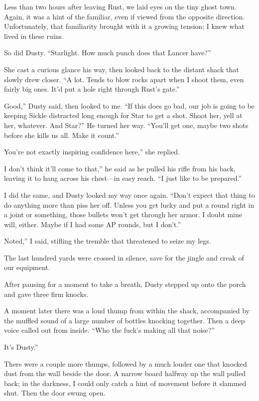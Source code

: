 Less than two hours after leaving Rust, we laid eyes on the tiny ghost town. Again, it was a hint of the familiar, even if viewed from the opposite direction. Unfortunately, that familiarity brought with it a growing tension; I knew what lived in these ruins.

So did Dusty. “Starlight. How much punch does that Lancer have?”

She cast a curious glance his way, then looked back to the distant shack that slowly drew closer. “A lot. Tends to blow rocks apart when I shoot them, even fairly big ones. It’d put a hole right through Rust’s gate.”

\leavevmode{}Good,” Dusty said, then looked to me. “If this does go bad, our job is going to be keeping Sickle distracted long enough for Star to get a shot. Shoot her, yell at her, whatever. And Star?” He turned her way. “You’ll get one, maybe two shots before she kills us all. Make it count.”

\leavevmode{}You’re not exactly inspiring confidence here,” she replied.

\leavevmode{}I don’t think it’ll come to that,” he said as he pulled his rifle from his back, leaving it to hang across his chest—in easy reach. “I just like to be prepared.”

I did the same, and Dusty looked my way once again. “Don’t expect that thing to do anything more than piss her off. Unless you get lucky and put a round right in a joint or something, those bullets won’t get through her armor. I doubt mine will, either. Maybe if I had some AP rounds, but I don’t.”

\leavevmode{}Noted,” I said, stifling the tremble that threatened to seize my legs.

The last hundred yards were crossed in silence, save for the jingle and creak of our equipment.

After pausing for a moment to take a breath, Dusty stepped up onto the porch and gave three firm knocks.

A moment later there was a loud thump from within the shack, accompanied by the muffled sound of a large number of bottles knocking together. Then a deep voice called out from inside. “Who the fuck’s making all that noise?”

\leavevmode{}It’s Dusty.”

There were a couple more thumps, followed by a much louder one that knocked dust from the wall beside the door. A narrow board halfway up the wall pulled back; in the darkness, I could only catch a hint of movement before it slammed shut. Then the door swung open.


